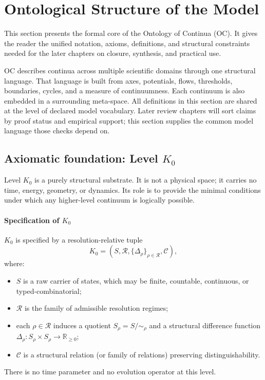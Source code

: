 
\section{Ontological Structure of the Model}
\label{sec:model}

This section presents the formal core of the Ontology of Continua (OC).
It gives the reader the unified notation, axioms, definitions, and structural
constraints needed for the later chapters on closure, synthesis, and practical
use.

OC describes continua across multiple scientific domains through one structural
language. That language is built from axes, potentials, flows, thresholds,
boundaries, cycles, and a measure of continuumness. Each continuum is also
embedded in a surrounding meta-space. All definitions in this section are
shared at the level of declared model vocabulary. Later review chapters
will sort claims by proof status and empirical support; this section supplies
the common model language those checks depend on.

\subsection{Axiomatic foundation: Level \texorpdfstring{$K_0$}{K\_0}}

Level \(K_0\) is a purely structural substrate.
It is not a physical space; it carries no time, energy, geometry, or dynamics.
Its role is to provide the minimal conditions under which any higher-level continuum is logically possible.

\paragraph{Specification of \texorpdfstring{\(K_0\)}{K\_0}}
\(K_0\) is specified by a resolution-relative tuple
\[
    K_0 = (S,\mathcal{R},\{\Delta_\rho\}_{\rho\in\mathcal{R}},\mathcal{C}),
\]
where:
\begin{itemize}
    \item \(S\) is a raw carrier of states, which may be finite, countable, continuous, or typed-combinatorial;
    \item \(\mathcal{R}\) is the family of admissible resolution regimes;
    \item each \(\rho\in\mathcal{R}\) induces a quotient \(S_\rho=S/{\sim_\rho}\) and a structural difference function \(\Delta_\rho:S_\rho\times S_\rho\to\mathbb{R}_{\ge 0}\);
    \item \(\mathcal{C}\) is a structural relation (or family of relations) preserving distinguishability.
\end{itemize}
There is no time parameter and no evolution operator at this level.


